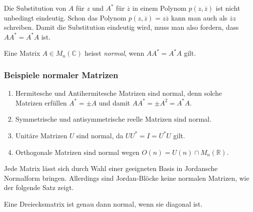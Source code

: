 Die Substitution von $A$ für $z$ und $A^*$ für $\overline{z}$
in einem Polynom $p(z,\overline{z})$ ist nicht unbedingt eindeutig.
Schon das Polynom $p(z,\overline{z})=z\overline{z}$ kann man auch
als $\overline{z}z$ schreiben.
Damit die Substitution eindeutig wird, muss man also fordern, dass
$AA^* = A^*A$ ist.

\begin{definition}
Eine Matrix $A\in M_n(\mathbb{C})$ heisst {\em normal}, wenn $AA^*=A^*A$ gilt.
%
\end{definition}

\subsubsection{Beispiele normaler Matrizen}

\begin{enumerate}
\item
Hermitesche und Antihermitesche Matrizen sind normal, denn solche
%
%
Matrizen erfüllen $A^*=\pm A$ und damit
\(
AA^* = \pm A^2 = A^*A.
\)
\item
Symmetrische und antisymmetrische reelle Matrizen sind normal.
%
%
\item
Unitäre Matrizen $U$ sind normal, da $UU^*=I=U^*U$ gilt.
%
\item
Orthogonale Matrizen sind normal wegen $O(n) = U(n) \cap M_n(\mathbb{R})$.
%
\end{enumerate}

Jede Matrix lässt sich durch Wahl einer geeigneten Basis in Jordansche 
Normalform bringen.
Allerdings sind Jordan-Blöcke keine normalen Matrizen, wie der folgende
Satz zeigt.

\begin{satz}
Eine Dreiecksmatrix ist genau dann normal, wenn sie diagonal ist.
%
\end{satz}

